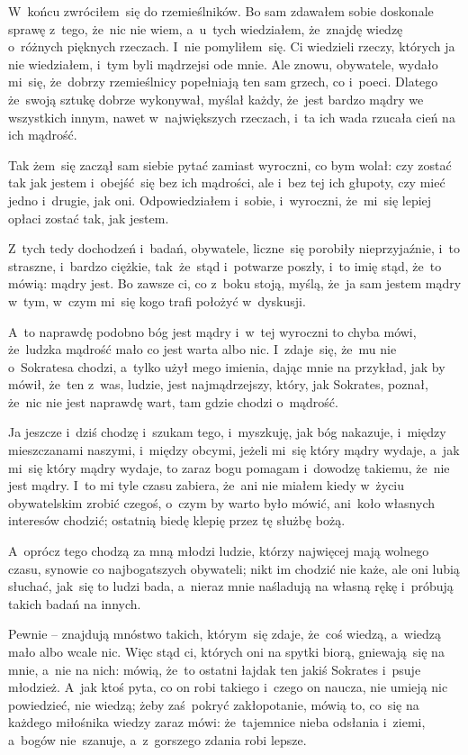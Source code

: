 \documentclass[a4paper,11pt]{article}
\begin{document}
W~końcu zwróciłem~się do rzemieślników. Bo sam zdawałem sobie
doskonale sprawę z~tego, że~nic nie wiem, a~u~tych wiedziałem,
że~znajdę wiedzę o~różnych pięknych rzeczach. I~nie pomyliłem~się. Ci
wiedzieli rzeczy, których ja nie wiedziałem, i~tym byli mądrzejsi ode
mnie. Ale znowu, obywatele, wydało mi~się, że~dobrzy rzemieślnicy
popełniają ten sam grzech, co i~poeci. Dlatego że~swoją sztukę dobrze
wykonywał, myślał każdy, że~jest bardzo mądry we wszystkich innym,
nawet w~największych rzeczach, i~ta ich wada rzucała cień na ich
mądrość.

Tak żem~się zaczął sam siebie pytać zamiast wyroczni, co bym wolał:
czy zostać tak jak jestem i~obejść~się bez ich mądrości, ale i~bez tej
ich głupoty, czy mieć jedno i~drugie, jak oni. Odpowiedziałem i~sobie,
i~wyroczni, że~mi~się lepiej opłaci zostać tak, jak jestem.

Z~tych tedy dochodzeń i~badań, obywatele, liczne~się porobiły
nieprzyjaźnie, i~to straszne, i~bardzo ciężkie, tak~że~stąd i~potwarze
poszły, i~to imię stąd, że~to mówią: mądry jest. Bo zawsze ci, co
z~boku stoją, myślą, że~ja sam jestem mądry w~tym, w~czym mi~się kogo
trafi położyć w~dyskusji.

A~to naprawdę podobno bóg jest mądry i~w~tej wyroczni to chyba mówi,
że~ludzka mądrość mało co jest warta albo nic. I~zdaje~się, że~mu nie
o~Sokratesa chodzi, a~tylko użył mego imienia, dając mnie na przykład,
jak by mówił, że~ten z~was, ludzie, jest najmądrzejszy, który, jak
Sokrates, poznał, że~nic nie jest naprawdę wart, tam gdzie chodzi
o~mądrość.

Ja jeszcze i~dziś chodzę i~szukam tego, i~myszkuję, jak bóg nakazuje,
i~między mieszczanami naszymi, i~między obcymi, jeżeli mi~się który
mądry wydaje, a~jak mi~się który mądry wydaje, to zaraz bogu pomagam
i~dowodzę takiemu, że~nie jest mądry. I~to mi tyle czasu zabiera,
że~ani nie miałem kiedy w~życiu obywatelskim zrobić czegoś, o~czym by
warto było mówić, ani~koło własnych interesów chodzić; ostatnią biedę
klepię przez tę służbę bożą.

A~oprócz tego chodzą za mną młodzi ludzie, którzy najwięcej mają
wolnego czasu, synowie co najbogatszych obywateli; nikt im chodzić nie
każe, ale oni lubią słuchać, jak~się to ludzi bada, a~nieraz mnie
naśladują na własną rękę i~próbują takich badań na innych.

Pewnie -- znajdują mnóstwo takich, którym~się zdaje, że~coś wiedzą,
a~wiedzą mało albo wcale nic. Więc stąd ci, których oni na spytki
biorą, gniewają~się na mnie, a~nie na nich: mówią, że~to ostatni
łajdak ten jakiś Sokrates i~psuje młodzież. A~jak ktoś pyta, co on
robi takiego i~czego on naucza, nie umieją nic powiedzieć, nie wiedzą;
żeby zaś~pokryć zakłopotanie, mówią to, co~się na każdego miłośnika
wiedzy zaraz mówi: że~tajemnice nieba odsłania i~ziemi, a~bogów
nie~szanuje, a~z~gorszego zdania robi lepsze.
\end{document}
